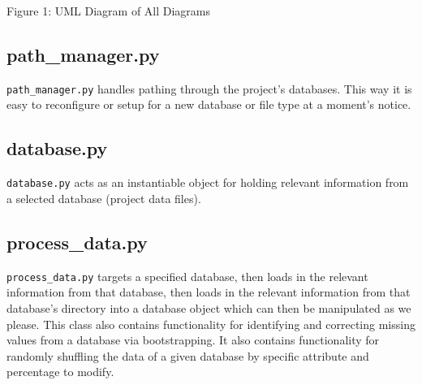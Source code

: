 \documentclass{article}
\begin{document}
\begin{centering}
    \caption{\label{test} Figure 1: UML Diagram of All Diagrams}
\end{centering}

\newpage

\subsection*{path\_manager.py}
\texttt{path\_manager.py} handles pathing through the project's databases. This way it is easy to reconfigure or setup for a new database or file type at a moment's notice.

\subsection*{database.py}
\texttt{database.py} acts as an instantiable object for holding relevant information from a selected database (project data files).

\subsection*{process\_data.py}
\texttt{process\_data.py} targets a specified database, then loads in the relevant information from that database, then loads in the relevant information from that database's directory into a database object which can then be manipulated as we please. This class also contains functionality for identifying and correcting missing values from a database via bootstrapping. It also contains functionality for randomly shuffling the data of a given database by specific attribute and percentage to modify.
\end{document}
